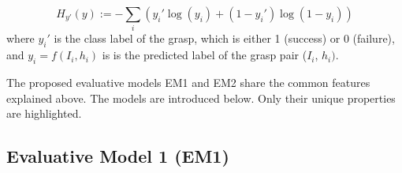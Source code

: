 \begin{equation}
H_{y'}(y) := - \sum_{i} ({y_i' \log(y_i) + (1-y_i') \log (1-y_i)})
\label{equation:crossentropy}
\end{equation}
where $y_i'$ is the class label of the grasp, which is either 1 (success) or 0 (failure), and $y_i = f(I_i, h_i)$ is is the predicted label of the grasp pair ($I_i$, $h_i)$.

The proposed evaluative models EM1 and EM2 share the common features explained above. The models are introduced below. Only their unique properties are highlighted.

\subsection{Evaluative Model 1 (EM1)}

